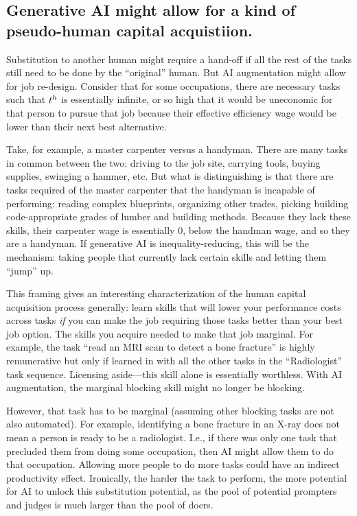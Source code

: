 \documentclass{article}
\theoremstyle{plain}
\theoremstyle{plain}
\begin{document}
\subsection{Generative AI might allow for a kind of pseudo-human capital acquistiion.}
Substitution to another human might require a hand-off if all the rest of the tasks still need to be done by the ``original'' human. 
But AI augmentation might allow for job re-design. 
Consider that for some occupations, there are necessary tasks such that $t^{h}_{}$ is essentially infinite, or so high that it would be uneconomic for that person to pursue that job because their effective efficiency wage would be lower than their next best alternative.  

Take, for example, a master carpenter versus a handyman.
There are many tasks in common between the two: driving to the job site, carrying tools, buying supplies, swinging a hammer, etc.
But what is distinguishing is that there are tasks required of the master carpenter that the handyman is incapable of performing: 
reading complex blueprints, organizing other trades, picking building code-appropriate grades of lumber and building methods.
Because they lack these skills, their carpenter wage is essentially 0, below the handman wage, and so they are a handyman.
If generative AI is inequality-reducing, this will be the mechanism: taking people that currently lack certain skills and letting them ``jump'' up. 

This framing gives an interesting characterization of the human capital acquisition process generally: 
learn skills that will lower your performance costs across tasks \emph{if} you can make the job requiring those tasks better than your best job option.
The skills you acquire needed to make that job marginal. 
For example, the task ``read an MRI scan to detect a bone fracture'' is highly remunerative but only if learned in with all the other tasks in the ``Radiologist'' task sequence.
Licensing aside---this skill alone is essentially worthless.  
With AI augmentation, the marginal blocking skill might no longer be blocking. 

However, that task has to be marginal (assuming other blocking tasks are not also automated). 
For example, identifying a bone fracture in an X-ray does not mean a person is ready to be a radiologist.
I.e., if there was only one task that precluded them from doing some occupation, then AI might allow them to do that occupation.
Allowing more people to do more tasks could have an indirect productivity effect. 
Ironically, the harder the task to perform, the more potential for AI to unlock this substitution potential, as the pool of potential prompters and judges is much larger than the pool of doers.
\end{document}

